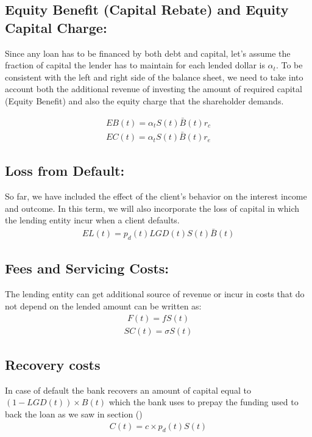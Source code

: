 \subsection{ Equity Benefit (Capital Rebate) and Equity Capital Charge: }
Since any loan has to be financed by both debt and capital, let's assume the fraction of capital the lender has to maintain for each lended dollar is $\alpha_t$. To be consistent with the left and right side of the balance sheet, we need to take into account both the additional revenue of investing the amount of required capital (Equity Benefit) and also the equity charge that the shareholder demands.

\begin{align}
EB(t) = \alpha_t S(t)\bar{ B}(t) r_c
\end{align}
\begin{align}
 EC(t) =  \alpha_t S(t)\bar{ B}(t) r_e
\end{align}

\subsection{ Loss from Default: }
So far, we have included the effect of the client's behavior on the interest income and outcome. In this term, we will also incorporate the loss of capital in which the lending entity incur when a client defaults. 
\begin{align}
EL(t) =  p_d(t)LGD(t)S(t)\bar{ B}(t) 
\end{align}

\subsection{ Fees and Servicing Costs: }
The lending entity can get additional source of revenue or incur in costs that do not depend on the lended amount can be written as:
\begin{align}
F(t) = f S(t)
\end{align}
\begin{align}
SC(t) =  \sigma S(t)
\end{align}


\subsection{Recovery costs}
In case of default the bank recovers an amount of capital equal to $(1-LGD(t)) \times B(t)$ which the bank uses to prepay the funding used to back the loan as we saw in section ()
\begin{align}
C(t) = c\times p_d(t) S(t)
\end{align}



